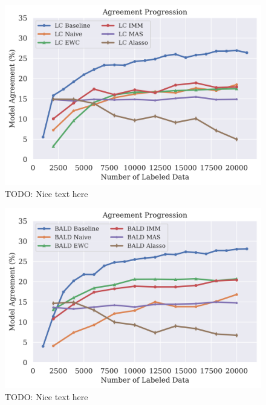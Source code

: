 \begin{figure}[h]
    \centering
    \includegraphics[width=0.8\linewidth]{images/results_CALMS/cifar100_softmax_lc.png}
    \caption[Agreement Comparison for Model Stealing on CIFAR10 using the softmax output and the Active Learning strategy LC]{TODO: Nice text here}
    \label{fig:CALMSCIFAR10SoftmaxLC}
\end{figure}

\begin{figure}[h]
    \centering
    \includegraphics[width=0.8\linewidth]{images/results_CALMS/cifar100_softmax_bald.png}
    \caption[Agreement Comparison for Model Stealing on CIFAR10 using the softmax output and the Active Learning strategy BALD]{TODO: Nice text here}
    \label{fig:CALMSCIFAR10SoftmaxBALD}
\end{figure}

